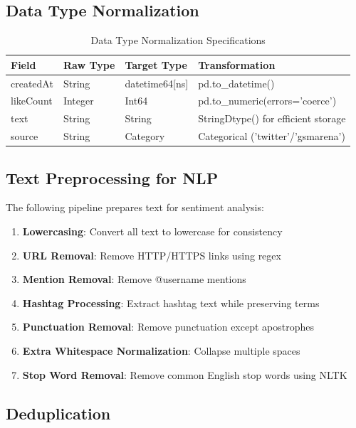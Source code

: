 \documentclass[11pt,a4paper]{article}
\begin{document}
\subsection{Data Type Normalization}

\begin{table}[H]
\centering
\begin{tabular}{>{\ttfamily}l l l l}
\toprule
\textbf{Field} & \textbf{Raw Type} & \textbf{Target Type} & \textbf{Transformation} \\
\midrule
createdAt & String & datetime64[ns] & pd.to\_datetime() \\
likeCount & Integer & Int64 & pd.to\_numeric(errors='coerce') \\
text & String & String & StringDtype() for efficient storage \\
source & String & Category & Categorical ('twitter'/'gsmarena') \\
\bottomrule
\end{tabular}
\caption{Data Type Normalization Specifications}
\label{tab:type-normalization}
\end{table}

\subsection{Text Preprocessing for NLP}

The following pipeline prepares text for sentiment analysis:

\begin{enumerate}
    \item \textbf{Lowercasing}: Convert all text to lowercase for consistency
    \item \textbf{URL Removal}: Remove HTTP/HTTPS links using regex
    \item \textbf{Mention Removal}: Remove @username mentions
    \item \textbf{Hashtag Processing}: Extract hashtag text while preserving terms
    \item \textbf{Punctuation Removal}: Remove punctuation except apostrophes
    \item \textbf{Extra Whitespace Normalization}: Collapse multiple spaces
    \item \textbf{Stop Word Removal}: Remove common English stop words using NLTK
\end{enumerate}

\subsection{Deduplication}
\end{document}
